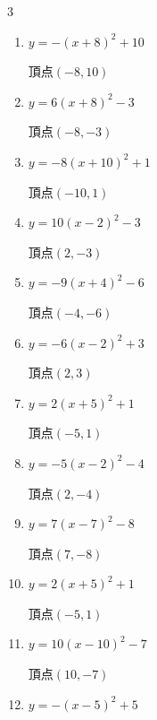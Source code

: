 \begin{multicols}{3}
\begin{enumerate}
  \item $\displaystyle y=-\left( x+8\right)^{2}+10$

        $\displaystyle 頂点\left( -8 , 10 \right)$

  \item $\displaystyle y=6\left( x+8\right)^{2}-3$

        $\displaystyle 頂点\left( -8 , -3 \right)$

  \item $\displaystyle y=-8\left( x+10\right)^{2}+1$

        $\displaystyle 頂点\left( -10 , 1 \right)$

  \item $\displaystyle y=10\left( x-2\right)^{2}-3$

        $\displaystyle 頂点\left( 2 , -3 \right)$

  \item $\displaystyle y=-9\left( x+4\right)^{2}-6$

        $\displaystyle 頂点\left( -4 , -6 \right)$

  \item $\displaystyle y=-6\left( x-2\right)^{2}+3$

        $\displaystyle 頂点\left( 2 , 3 \right)$

\columnbreak %

\resetques

  \item $\displaystyle y=2\left( x+5\right)^{2}+1$

        $\displaystyle 頂点\left( -5 , 1 \right)$

  \item $\displaystyle y=-5\left( x-2\right)^{2}-4$

        $\displaystyle 頂点\left( 2 , -4 \right)$

  \item $\displaystyle y=7\left( x-7\right)^{2}-8$

        $\displaystyle 頂点\left( 7 , -8 \right)$

  \item $\displaystyle y=2\left( x+5\right)^{2}+1$

        $\displaystyle 頂点\left( -5 , 1 \right)$

  \item $\displaystyle y=10\left( x-10\right)^{2}-7$

        $\displaystyle 頂点\left( 10 , -7 \right)$

  \item $\displaystyle y=-\left( x-5\right)^{2}+5$


\end{enumerate}
\end{multicols}
